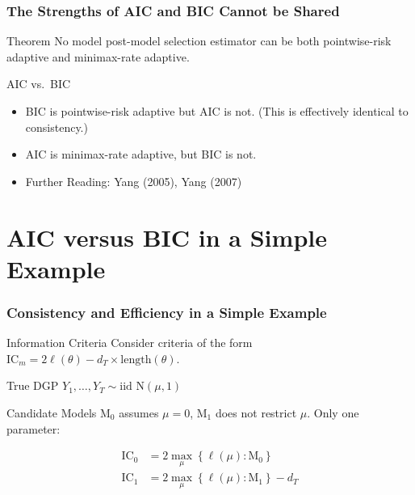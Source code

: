 \begin{frame}
  \frametitle{The Strengths of AIC and BIC Cannot be Shared}

  \begin{alertblock}{Theorem}
      No model post-model selection estimator can be both pointwise-risk adaptive and minimax-rate adaptive.
  \end{alertblock}

  \begin{block}{AIC vs.\ BIC}
  \begin{itemize}
    \item BIC is pointwise-risk adaptive but AIC is not. (This is effectively identical to consistency.)
    \item AIC is minimax-rate adaptive, but BIC is not.
    \item Further Reading: Yang (2005), Yang (2007)
  \end{itemize}
\end{block}

\end{frame}
\section{AIC versus BIC in a Simple Example}
\begin{frame}
  \frametitle{Consistency and Efficiency in a Simple Example}

  \begin{block}{Information Criteria}
    Consider criteria of the form $\text{IC}_m = 2\ell(\theta) - d_T \times \text{length}(\theta)$.
  \end{block}
 
  \pause
  
  \begin{block}{True DGP}
  $Y_{1}, \dots, Y_T \sim \mbox{iid N}(\mu, 1)$
  \end{block}

  \pause

  \begin{block}{Candidate Models}
    $\text{M}_0$ assumes $\mu = 0$, $\text{M}_1$ does not restrict $\mu$. Only one parameter:

    \vspace{-1em}
  \begin{align*}
    \text{IC}_0 &= 2 \max_\mu \left\{ \ell(\mu) \colon \text{M}_0 \right\} \\ 
    \text{IC}_1 &= 2 \max_\mu \left\{ \ell(\mu) \colon \text{M}_1 \right\} - d_T
  \end{align*}
  \end{block}


\end{frame}

